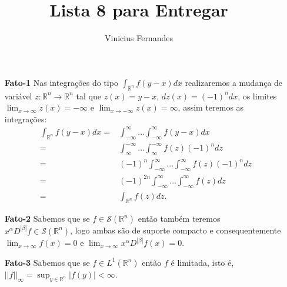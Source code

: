 \documentclass{article}
\begin{document}
	
	\title{Lista 8 para Entregar}
	\author{Vinicius Fernandes}
	
	\maketitle
	
	\begin{enumerate}
		\item[\textbf{Fato-1}] Nas integrações do tipo $\int_{\mathbb{R}^{n}}f(y-x)dx$ realizaremos a mudança de variável $z: \mathbb{R}^{n} \to \mathbb{R}^{n}$ tal que $z(x) = y-x$, $dz(x) = (-1)^{n}dx$, os limites $\lim_{x \to \infty} z(x) = -\infty$ e $\lim_{x \to -\infty} z(x) = \infty$, assim teremos as integrações: 
		$$
		\begin{aligned}
		\int_{\mathbb{R}^{n}}f(y-x)dx = & \int_{-\infty}^{\infty} ...\int_{-\infty}^{\infty} f(y-x)dx
		\\
		= & \int_{\infty}^{-\infty} ...\int_{\infty}^{-\infty} f(z)(-1)^{n}dz
		\\
		= & (-1)^{n}\int_{-\infty}^{\infty} ...\int_{-\infty}^{\infty} f(z)(-1)^{n}dz
		\\
		= & (-1)^{2n}\int_{-\infty}^{\infty} ...\int_{-\infty}^{\infty} f(z)dz
		\\
		= & \int_{\mathbb{R}^{n}} f(z)dz.
		\end{aligned}$$
		
		\item[\textbf{Fato-2}] Sabemos que se $f \in \mathcal{S}(\mathbb{R}^{n})$ então também teremos $x^{\alpha}D^{|\beta|}f \in \mathcal{S}(\mathbb{R}^{n})$, logo ambas são de suporte compacto e consequentemente $\lim_{x \to \infty}f(x)=0$ e $\lim_{x \to \infty}x^{\alpha}D^{|\beta|}f(x)=0$.
		
		\item[\textbf{Fato-3}] Sabemos que se $f \in L^{1}(\mathbb{R}^{n})$ então $f$ é limitada, isto é, $||f||_{\infty} = \sup_{y \in \mathbb{R}^{n}}|f(y)| < \infty$.
		

\end{enumerate}
\end{document}

